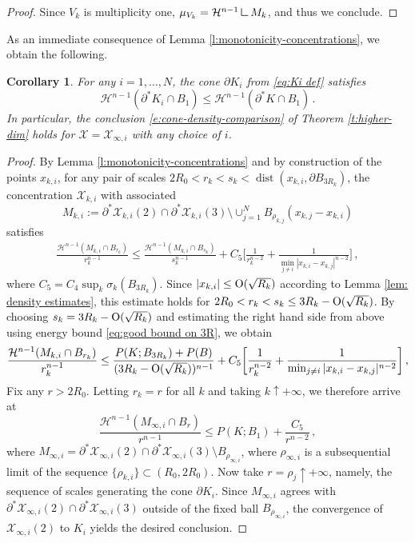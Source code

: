 \documentclass[10pt,reqno]{amsart}
\numberwithin{equation}{section}
\newtheorem{corollary}[theorem]{Corollary}
\theoremstyle{definition}
\newcommand{\Hcal}{\mathcal{H}}
\DeclareMathOperator{\dist}{dist}
\newcommand{\mres}{\mathbin{\vrule height 1.6ex depth 0pt width
        0.13ex\vrule height 0.13ex depth 0pt width 1.3ex}}
\newcommand{\X}{\mathcal{X}}
\begin{document}
{\begin{proof}
Since $V_k$ is multiplicity one, $\mu_{V_k} = \Hcal^{n-1}\mres M_k$, and thus we conclude.
\end{proof}

As an immediate consequence of Lemma \ref{l:monotonicity-concentrations}, we obtain the following.
\begin{corollary}\label{c:blowdown-density-bound}
    For any $i=1,\dots, N$, the cone $\partial K_i$ from \eqref{eq:Ki def} satisfies
    \[
        \Hcal^{n-1}(\partial^* K_i \cap B_1) \leq \Hcal^{n-1}(\partial^* K\cap B_1)\,.
    \]
   In particular, the conclusion \eqref{e:cone-density-comparison} of Theorem \ref{t:higher-dim} holds for $\X = \X_{\infty,i}$ with any choice of $i$.
\end{corollary}

\begin{proof}
By Lemma \ref{l:monotonicity-concentrations} and by construction of the points $x_{k,i}$, for any pair of scales $2R_0<r_k<s_k<\dist(x_{k,i},\partial B_{3R_k})$, the concentration $\X_{k,i}$ with associated
\[
    M_{k,i} := \partial^*\X_{k,i}(2) \cap \partial^* \X_{k,i}(3) \setminus \cup_{j=1}^N B_{\rho_{k,j}}(x_{k,j}-x_{k,i})
\]
satisfies
\begin{align*}
    \frac{\mathcal{H}^{n-1}({M_{k,i}} \cap B_{r_k})}{r_k^{n-1}} \leq \frac{\mathcal{H}^{n-1}({M_{k,i}} \cap B_{s_k})}{s_k^{n-1}} + C_5 \bigg[\frac{1}{r_k^{n-2}} + \frac{1}{\min_{j\neq i}|x_{k,i}-x_{k,j}|^{n-2}}\bigg]\,,
\end{align*}
where $C_5 = C_4\sup_k \sigma_{k}(B_{3R_k})$. Since $|x_{k,i}|\leq {\rm O}(\sqrt{R_k})$ according to Lemma \ref{lem: density estimates}, this estimate holds for $2R_0<r_k < s_k \leq 3R_k - {\rm O}(\sqrt{R_k})$.
By choosing $s_k = 3R_k - {\rm O}(\sqrt{R_k})$ and estimating the right hand side from above using energy bound \eqref{eq:good bound on 3R}, we obtain
\begin{align*}
    \frac{\mathcal{H}^{n-1}(M_{k,i} \cap B_{r_k})}{r_k^{n-1}} \leq \frac{P(K;B_{3R_k})+P(B)}{(3R_k-{\rm O}(\sqrt{R_k}))^{n-1}} + C_5 \bigg[\frac{1}{r_k^{n-2}} + \frac{1}{\min_{j\neq i}|x_{k,i}-x_{k,j}|^{n-2}}\bigg]\,,
\end{align*}
Fix any $r>2R_0$. {Letting $r_k=r$ for all $k$ and} taking $k \uparrow +\infty$, we therefore arrive at
\[
    \frac{\mathcal{H}^{n-1}(M_{\infty,i} \cap B_{r})}{r^{n-1}} \leq P( K ; B_1)  + \frac{C_5}{r^{n-2}}\,,
\]
where $M_{\infty, i} = \partial^* \X_{\infty,i}(2) \cap \partial^* \X_{\infty,i}(3) \setminus  B_{\rho_{\infty,i}}$, where $\rho_{\infty,i}$ is a subsequential limit of the sequence $\{\rho_{k,i}\} \subset (R_0,2R_0)$. Now take $r = \rho_j \uparrow +\infty$, namely, the sequence of scales generating the cone $\partial K_i$. Since $M_{\infty,i}$ agrees with $\partial^* \X_{\infty,i}(2) \cap \partial^* \X_{\infty,i}(3)$ outside of the fixed ball $B_{\rho_{\infty,i}}$, the convergence of $\X_{\infty,i}(2)$ to $K_i$ yields the desired conclusion.
\end{proof}
%
%

}
\end{document}
